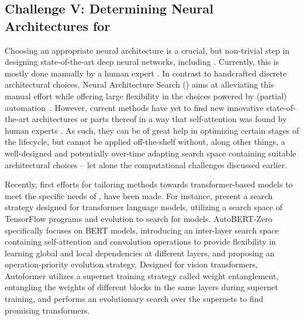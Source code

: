 \subsection{Challenge V: Determining Neural Architectures for \LLMs}
Choosing an appropriate neural architecture is a crucial, but non-trivial step in designing state-of-the-art deep neural networks, including \LLMs \cite{white-arxiv23a}. Currently, this is mostly done manually by a human expert \cite{hutter-blog22a}. In contrast to handcrafted discrete architectural choices, Neural Architecture Search (\NAS) aims at alleviating this manual effort  while offering large flexibility in the choices powered by (partial) automation~\cite{elsken-jmlr19a}. However, current \NAS methods have yet to find new innovative state-of-the-art architectures or parts thereof in a way that self-attention was found by human experts \cite{vaswani-neurips17a}. As such, they can be of great help in optimizing certain stages of the \LLM lifecycle, but cannot be applied off-the-shelf without, along other things, a well-designed and potentially over-time adapting search space containing suitable architectural choices -- let alone the computational challenges discussed earlier. 

Recently, first efforts for tailoring \NAS methods towards transformer-based models \cite{chitty-ieeea22a} to meet the specific needs of \LLMs, have been made. 
For instance, \cite{so-neurips2022a} present a search strategy designed for transformer language models, utilizing a search space of TensorFlow programs and evolution to search for models.
AutoBERT-Zero \cite{gao-aaai2021a} specifically focuses on BERT models, introducing an inter-layer search space containing self-attention and convolution operations to provide flexibility in learning global and local dependencies at different layers, and proposing an operation-priority evolution strategy.
Designed for vision transformers, Autoformer \cite{chen-iccv21b} utilizes a supernet training strategy called weight entanglement, entangling the weights of different blocks in the same layers during supernet training, and performs an evolutionary search over the supernets to find promising transformers.

